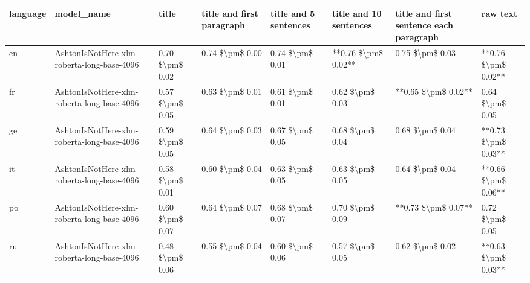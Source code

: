 \begin{tabular}{llllllll}
\toprule
language &                                 model\_name &           title & title and first paragraph & title and 5 sentences & title and 10 sentences & title and first sentence each paragraph &            raw text \\
\midrule
      en & AshtonIsNotHere-xlm-roberta-long-base-4096 & 0.70 \$\textbackslash pm\$ 0.02 &           0.74 \$\textbackslash pm\$ 0.00 &       0.74 \$\textbackslash pm\$ 0.01 &    **0.76 \$\textbackslash pm\$ 0.02** &                         0.75 \$\textbackslash pm\$ 0.03 & **0.76 \$\textbackslash pm\$ 0.02** \\
      fr & AshtonIsNotHere-xlm-roberta-long-base-4096 & 0.57 \$\textbackslash pm\$ 0.05 &           0.63 \$\textbackslash pm\$ 0.01 &       0.61 \$\textbackslash pm\$ 0.01 &        0.62 \$\textbackslash pm\$ 0.03 &                     **0.65 \$\textbackslash pm\$ 0.02** &     0.64 \$\textbackslash pm\$ 0.05 \\
      ge & AshtonIsNotHere-xlm-roberta-long-base-4096 & 0.59 \$\textbackslash pm\$ 0.05 &           0.64 \$\textbackslash pm\$ 0.03 &       0.67 \$\textbackslash pm\$ 0.05 &        0.68 \$\textbackslash pm\$ 0.04 &                         0.68 \$\textbackslash pm\$ 0.04 & **0.73 \$\textbackslash pm\$ 0.03** \\
      it & AshtonIsNotHere-xlm-roberta-long-base-4096 & 0.58 \$\textbackslash pm\$ 0.01 &           0.60 \$\textbackslash pm\$ 0.04 &       0.63 \$\textbackslash pm\$ 0.05 &        0.63 \$\textbackslash pm\$ 0.05 &                         0.64 \$\textbackslash pm\$ 0.04 & **0.66 \$\textbackslash pm\$ 0.06** \\
      po & AshtonIsNotHere-xlm-roberta-long-base-4096 & 0.60 \$\textbackslash pm\$ 0.07 &           0.64 \$\textbackslash pm\$ 0.07 &       0.68 \$\textbackslash pm\$ 0.07 &        0.70 \$\textbackslash pm\$ 0.09 &                     **0.73 \$\textbackslash pm\$ 0.07** &     0.72 \$\textbackslash pm\$ 0.05 \\
      ru & AshtonIsNotHere-xlm-roberta-long-base-4096 & 0.48 \$\textbackslash pm\$ 0.06 &           0.55 \$\textbackslash pm\$ 0.04 &       0.60 \$\textbackslash pm\$ 0.06 &        0.57 \$\textbackslash pm\$ 0.05 &                         0.62 \$\textbackslash pm\$ 0.02 & **0.63 \$\textbackslash pm\$ 0.03** \\
\bottomrule
\end{tabular}
